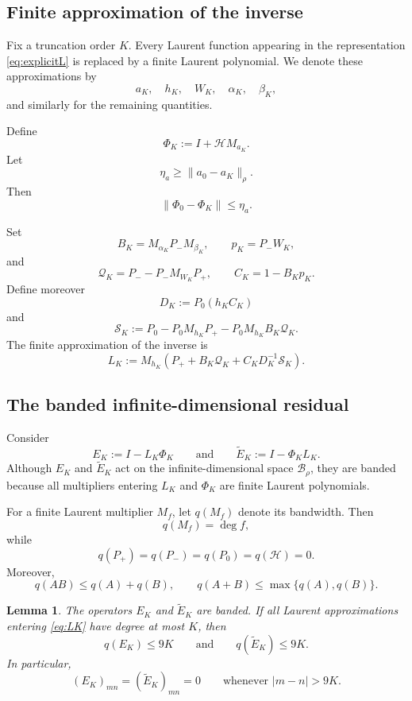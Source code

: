 \documentclass[11pt,a4paper]{amsart}
\newtheorem{lemma}[theorem]{Lemma}
\begin{document}
\subsection{Finite approximation of the inverse}

Fix a truncation order $K$. Every Laurent function appearing in the
representation \eqref{eq:explicitL} is replaced by a finite Laurent
polynomial. We denote these approximations by
\[
a_K,\quad
h_K,\quad
W_K,\quad
\alpha_K,\quad
\beta_K,
\]
and similarly for the remaining quantities.

Define
\[
\Phi_K
:=
I+\mathcal H M_{a_K}.
\]
Let
\[
\eta_a
\ge
\|a_0-a_K\|_\rho.
\]
Then
\begin{equation}\label{eq:PhiError}
	\|\Phi_0-\Phi_K\|
	\le
	\eta_a.
\end{equation}

Set
\[
B_K
=
M_{\alpha_K}P_-M_{\beta_K},
\qquad
p_K=P_-W_K,
\]
and
\[
\mathcal Q_K
=
P_--P_-M_{W_K}P_+,
\qquad
C_K
=
1-B_Kp_K.
\]
Define moreover
\[
D_K:=P_0(h_KC_K)
\]
and
\[
\mathcal S_K
:=
P_0
-
P_0M_{h_K}P_+
-
P_0M_{h_K}B_K\mathcal Q_K.
\]
The finite approximation of the inverse is
\begin{equation}\label{eq:LK}
	L_K
	:=
	M_{h_K}
	\left(
	P_+
	+
	B_K\mathcal Q_K
	+
	C_KD_K^{-1}\mathcal S_K
	\right).
\end{equation}

\subsection{The banded infinite-dimensional residual}

Consider
\[
E_K:=I-L_K\Phi_K\qquad\text{and}\qquad \widetilde{E}_K:=I-\Phi_K L_K.
\]
Although $E_K$ and $\widetilde{E}_K$ act on the infinite-dimensional space
$\mathcal B_\rho$, they are banded because all multipliers entering
$L_K$ and $\Phi_K$ are finite Laurent polynomials.

For a finite Laurent multiplier $M_f$, let $q(M_f)$ denote its
bandwidth. Then
\[
q(M_f)=\deg f,
\]
while
\[
q(P_+)=q(P_-)=q(P_0)=q(\mathcal H)=0.
\]
Moreover,
\[
q(AB)\le q(A)+q(B),
\qquad
q(A+B)\le\max\{q(A),q(B)\}.
\]

\begin{lemma}\label{lem:bandwidth}
	The operators $E_K$ and $\widetilde{E}_K$ are banded. If all Laurent approximations entering \eqref{eq:LK} have degree at most $K$, then
	\begin{equation}\label{eq:bandwidth}
		q(E_K)\le9K\qquad\text{and}\qquad q(\widetilde{E}_K)\le9K.
	\end{equation}
	In particular,
	\[
	(E_K)_{mn}=(\widetilde{E}_K)_{mn}=0
	\qquad
	\text{whenever }
	|m-n|>9K.
	\]
\end{lemma}
\end{document}
